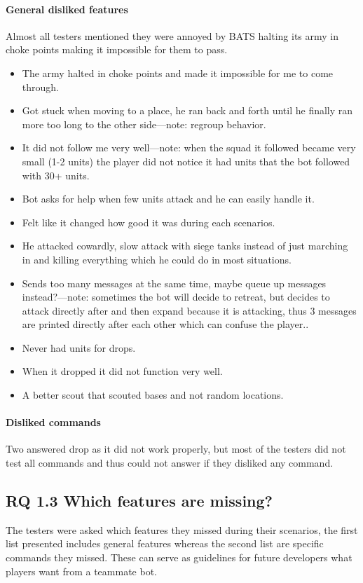 \paragraph{General disliked features}
Almost all testers mentioned they were annoyed by BATS halting its army in choke points making it
impossible for them to pass.
\begin{itemize}
	\item The army halted in choke points and made it impossible for me to come through.
	\item Got stuck when moving to a place, he ran back and forth until he finally ran more too long
		to the other side—note: regroup behavior.
	\item It did not follow me very well—note: when the squad it followed became very small (1-2
		units) the player did not notice it had units that the bot followed with 30+ units.
	\item Bot asks for help when few units attack and he can easily handle it.
	\item Felt like it changed how good it was during each scenarios.
	\item He attacked cowardly, slow attack with siege tanks instead of just marching in and killing
		everything which he could do in most situations.
	\item Sends too many messages at the same time, maybe queue up messages instead?—note: sometimes
		the bot will decide to retreat, but decides to attack directly after and then expand
		because it is attacking, thus 3 messages are printed directly after each other which can
		confuse the player..
	\item Never had units for drops.
	\item When it dropped it did not function very well.
	\item A better scout that scouted bases and not random locations.
\end{itemize}

\paragraph{Disliked commands}Two answered drop as it did not work properly, but most of the testers did not test all commands and thus could not answer if they disliked any command.

\subsection{RQ 1.3 Which features are missing?}
The testers were asked which features they missed during their scenarios, the first list presented
includes general features whereas the second list are specific commands they missed. These can serve
as guidelines for future developers what players want from a teammate bot.
